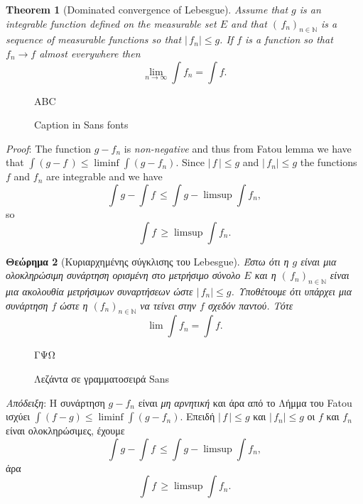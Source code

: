 \documentclass{article}
\newtheorem{theorem}{Theorem}
\newtheorem{theoremg}[theorem]{Θεώρημα}
\begin{document}
\begin{theorem}[Dominated convergence of Lebesgue]
Assume that $g$ is an
in\-te\-grable func\-tion defined on the measurable set $E$ and that
  $(\,f_n)_{n\in\mathbb N}$ is a sequence of mea\-sur\-able functions so that
  $|\,f_n|\leq g$. If $f$ is a function so that $f_n\to f$ almost everywhere
  then $$\lim_{n\to\infty}\int f_n=\int f.$$
\end{theorem}

\begin{figure}\vspace*{-1.8\baselineskip}
\begin{center}
  {\Huge\textsf{\color{lightgray}ABC}}
\end{center}
\caption{Caption in Sans fonts}
\end{figure}
\textit{Proof}: The function $g-f_n$ is \textit{non-negative} and thus from Fatou lemma
we have that $\int(g-f\,)\leq\liminf\int(g-f_n)$. Since $|\,f\,|\leq g$ and
$|\,f_n|\leq g$ the  functions $f$ and $f_n$ are integrable and we have
$$\int g-\int f\,\leq \int g-\limsup\int f_n,$$ so
$$\int f\,\geq \limsup \int f_n.$$
\par



\begin{theoremg}[Κυριαρχημένης σύγκλισης του Lebesgue]
  Έστω ότι
η $g$ είναι μια ολοκληρώσιμη συνάρτηση ορισμένη στο μετρήσιμο σύνολο
$E$ και η $(\,f_n)_{n\in\mathbb N}$ είναι μια ακολουθία μετρήσιμων συναρτήσεων ώστε
$|\,f_n| ≤ g$. Υποθέτουμε ότι υπάρχει μια συνάρτηση $f$
ώστε η  $(f_n)_{n\in\mathbb N}$ να
τείνει στην $f$ σχεδόν παντού. Τότε
$$\lim \int f_n =\int f.$$
\end{theoremg}

\begin{figure}\vspace*{-1.8\baselineskip}
\begin{center}
  {\Huge\textsf{\color{lightgray}ΓΨΩ}}
\end{center}
\caption{Λεζάντα σε γραμματοσειρά Sans}
\end{figure}


\textit{Απόδειξη}: Η συνάρτηση $g − f_n$ είναι \textit{μη αρνητική} και άρα από
το Λήμμα του Fatou ισχύει
$\int (f-g) ≤ \liminf \int (g-f_n)$. Επειδή
$|\,f\,| ≤ g$ και $|\,f_n| ≤g$ οι $f$ και $f_n$ είναι ολοκληρώσιμες, έχουμε
$$\int g −\int f\, ≤ \int g − \limsup\int f_n,$$
άρα
$$\int f\,\geq \limsup \int f_n.$$
\end{document}

